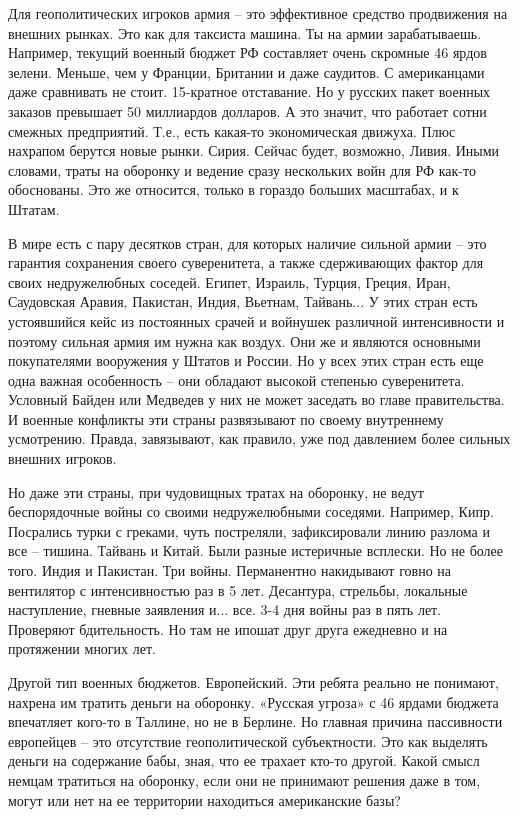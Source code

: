 Для геополитических игроков армия – это эффективное средство продвижения на
внешних рынках. Это как для таксиста машина. Ты на армии зарабатываешь.
Например, текущий военный бюджет РФ составляет очень скромные 46 ярдов зелени.
Меньше, чем у Франции, Британии и даже саудитов. С американцами даже сравнивать
не стоит. 15-кратное отставание. Но у русских пакет военных заказов превышает
50 миллиардов долларов. А это значит, что работает сотни смежных предприятий.
Т.е., есть какая-то экономическая движуха. Плюс нахрапом берутся новые рынки.
Сирия. Сейчас будет, возможно, Ливия. Иными словами, траты на оборонку и
ведение сразу нескольких войн для РФ как-то обоснованы. Это же относится,
только в гораздо больших масштабах, и к Штатам.

В мире есть с пару десятков стран, для которых наличие сильной армии – это
гарантия сохранения своего суверенитета, а также сдерживающих фактор для своих
недружелюбных соседей. Египет, Израиль, Турция, Греция, Иран, Саудовская
Аравия, Пакистан, Индия, Вьетнам, Тайвань... У этих стран есть устоявшийся кейс
из постоянных срачей и войнушек различной интенсивности и поэтому сильная армия
им нужна как воздух. Они же и являются основными покупателями вооружения у
Штатов и России. Но у всех этих стран есть еще одна важная особенность – они
обладают высокой степенью суверенитета. Условный Байден или Медведев у них не
может заседать во главе правительства. И военные конфликты эти страны
развязывают по своему внутреннему усмотрению. Правда, завязывают, как правило,
уже под давлением более сильных внешних игроков.

Но даже эти страны, при чудовищных тратах на оборонку, не ведут беспорядочные
войны со своими недружелюбными соседями. Например, Кипр. Посрались турки с
греками, чуть постреляли, зафиксировали линию разлома и все – тишина. Тайвань и
Китай. Были разные истеричные всплески. Но не более того. Индия и Пакистан. Три
войны. Перманентно накидывают говно на вентилятор с интенсивностью раз в 5 лет.
Десантура, стрельбы, локальные наступление, гневные заявления и... все. 3-4 дня
войны раз в пять лет. Проверяют бдительность. Но там не ипошат друг друга
ежедневно и на протяжении многих лет.

Другой тип военных бюджетов. Европейский. Эти ребята реально не понимают,
нахрена им тратить деньги на оборонку. «Русская угроза» с 46 ярдами бюджета
впечатляет кого-то в Таллине, но не в Берлине. Но главная причина пассивности
европейцев – это отсутствие геополитической субъектности. Это как выделять
деньги на содержание бабы, зная, что ее трахает кто-то другой. Какой смысл
немцам тратиться на оборонку, если они не принимают решения даже в том, могут
или нет на ее территории находиться американские базы?

